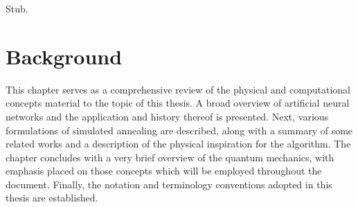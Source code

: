 \documentclass[11pt]{afthesis}
\begin{document}
	
	
	
	Stub.
	
	
	
	
	\chapter{Background} %
	
	This chapter serves as a comprehensive review of the physical and computational concepts material to the topic of this thesis. A broad overview of artificial neural networks and the application and history thereof is presented. Next, various formulations of simulated annealing are described, along with a summary of some related works and a description of the physical inspiration for the algorithm. The chapter concludes with a very brief overview of the quantum mechanics, with emphasis placed on those concepts which will be employed throughout the document. Finally, the notation and terminology conventions adopted in this thesis are established.
	
\end{document}
